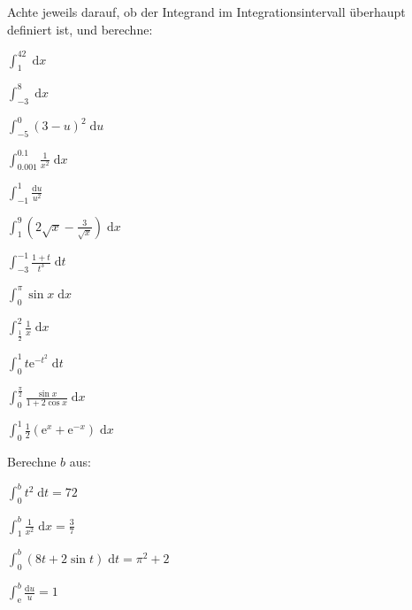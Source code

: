 \documentclass[%
11pt,%
twoside,%
titlepage,%
german,%
headsepline%
]{scrartcl}
\begin{document}
\begin{ueb}[integriere]
Achte jeweils darauf, ob der Integrand im Integrationsintervall überhaupt definiert ist, und berechne:

\begin{minipage}{0.4\textwidth}
\begin{enumeratea}
\item $\int_1^42\;\mathrm{d}x$
\item $\int_{-3}^8\;\mathrm{d}x$
\item $\int_{-5}^0(3-u)^2\;\mathrm{d}u$
\item $\int_{0.001}^{0.1}\frac{1}{x^2}\;\mathrm{d}x$
\item $\int_{-1}^1\frac{\mathrm{d}u}{u^2}$
\item $\int_1^9(2\sqrt{x}-\frac{3}{\sqrt{x}})\;\mathrm{d}x$
\end{enumeratea}
\end{minipage}
\begin{minipage}{3.9cm}
\begin{enumeratea}
\addtocounter{enumi}{6}
\item $\int_{-3}^{-1}\frac{1+t}{t^3}\;\mathrm{d}t$
\item $\int_0^\pi\sin x\;\mathrm{d}x$
\item $\int_\frac{1}{2}^2\frac{1}{x}\;\mathrm{d}x$
\item $\int_0^1t\mathrm{e}^{-t^2}\;\mathrm{d}t$
\item $\int_0^\frac{\pi}{2}\frac{\sin x}{1+2\cos x}\;\mathrm{d}x$
\item $\int_0^1\frac{1}{2}(\mathrm{e}^x+\mathrm{e}^{-x})\;\mathrm{d}x$
\end{enumeratea}
\end{minipage}
\end{ueb}

\begin{ueb}[Grenzen]
Berechne $b$ aus:

\begin{minipage}{0.4\textwidth}
\begin{enumeratea}
\item $\int_0^bt^2\;\mathrm{d}t=72$
\item $\int_1^b\frac{1}{x^2}\;\mathrm{d}x=\frac{3}{7}$
\end{enumeratea}
\end{minipage}
\begin{minipage}{7cm}
\begin{enumeratea}
\addtocounter{enumi}{2}
\item $\int_0^b(8t+2\sin t)\;\mathrm{d}t=\pi^2+2$
\item $\int_\mathrm{e}^b\frac{\mathrm{d}u}{u}=1$
\end{enumeratea}
\end{minipage}
\end{ueb}
\end{document}
